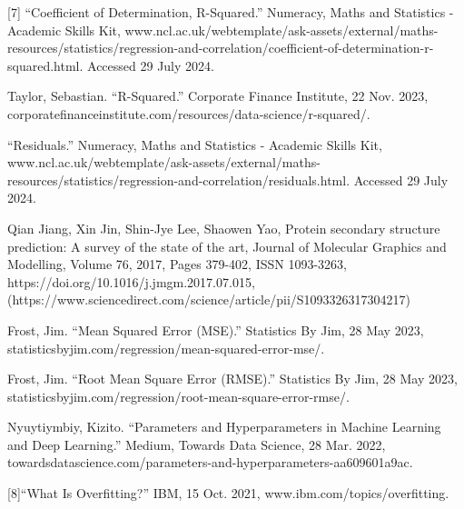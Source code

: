 \documentclass{article}
\begin{document}
[7] “Coefficient of Determination, R-Squared.” Numeracy, Maths and Statistics - Academic Skills Kit, www.ncl.ac.uk/webtemplate/ask-assets/external/maths-resources/statistics/regression-and-correlation/coefficient-of-determination-r-squared.html. Accessed 29 July 2024. 

Taylor, Sebastian. “R-Squared.” Corporate Finance Institute, 22 Nov. 2023, corporatefinanceinstitute.com/resources/data-science/r-squared/. 

“Residuals.” Numeracy, Maths and Statistics - Academic Skills Kit, www.ncl.ac.uk/webtemplate/ask-assets/external/maths-resources/statistics/regression-and-correlation/residuals.html. Accessed 29 July 2024. 

Qian Jiang, Xin Jin, Shin-Jye Lee, Shaowen Yao,
Protein secondary structure prediction: A survey of the state of the art,
Journal of Molecular Graphics and Modelling, Volume 76, 2017, Pages 379-402, ISSN 1093-3263, https://doi.org/10.1016/j.jmgm.2017.07.015, (https://www.sciencedirect.com/science/article/pii/S1093326317304217)

Frost, Jim. “Mean Squared Error (MSE).” Statistics By Jim, 28 May 2023, statisticsbyjim.com/regression/mean-squared-error-mse/. 

Frost, Jim. “Root Mean Square Error (RMSE).” Statistics By Jim, 28 May 2023, statisticsbyjim.com/regression/root-mean-square-error-rmse/. 

Nyuytiymbiy, Kizito. “Parameters and Hyperparameters in Machine Learning and Deep Learning.” Medium, Towards Data Science, 28 Mar. 2022, towardsdatascience.com/parameters-and-hyperparameters-aa609601a9ac. 

[8]“What Is Overfitting?” IBM, 15 Oct. 2021, www.ibm.com/topics/overfitting. 
\end{document}
